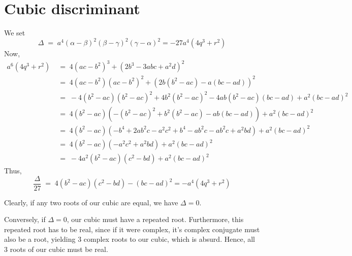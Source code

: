 \documentclass[10pt]{article}
\begin{document}
        \section{Cubic discriminant}
        We set 
        \[\Delta \;=\; a^4(\alpha - \beta)^2(\beta - \gamma)^2(\gamma - \alpha)^2 = -27a^4(4q^3 + r^2)\]
        Now,
        \begin{align*}
                a^6(4q^3 + r^2) \;&=\; 4(ac - b^2)^3 + (2b^3 - 3abc + a^2d)^2 \\
                        \;&=\; 4(ac - b^2)(ac - b^2)^2 + (2b(b^2 - ac) - a(bc - ad))^2 \\
                        \;&=\; -4(b^2 - ac)(b^2 - ac)^2 + 4b^2(b^2 - ac)^2 - 4ab(b^2 - ac)(bc - ad) + a^2(bc - ad)^2 \\
                        \;&=\; 4(b^2 - ac)(-(b^2 - ac)^2 + b^2(b^2 - ac) - ab(bc - ad)) + a^2(bc - ad)^2 \\
                        \;&=\; 4(b^2 - ac)(-b^4 + 2ab^2c - a^2c^2 + b^4 - ab^2c - ab^2c + a^2bd) + a^2(bc - ad)^2 \\
                        \;&=\; 4(b^2 - ac)(-a^2c^2 + a^2bd) + a^2(bc - ad)^2 \\
                        \;&=\; -4a^2(b^2 - ac)(c^2 - bd) + a^2(bc - ad)^2
        \end{align*}
        Thus,
        \[\frac{\Delta}{27} \;=\; 4(b^2 - ac)(c^2 - bd) - (bc - ad)^2 = -a^4(4q^3 + r^2)\]

        Clearly, if any two roots of our cubic are equal, we have $\Delta = 0$.

        Conversely, if $\Delta = 0$, our cubic must have a repeated root. Furthermore, this repeated root has to be real,
        since if it were complex, it's complex conjugate must also be a root, yielding $3$ complex roots to our cubic, which is absurd.
        Hence, all $3$ roots of our cubic must be real.
\end{document}
